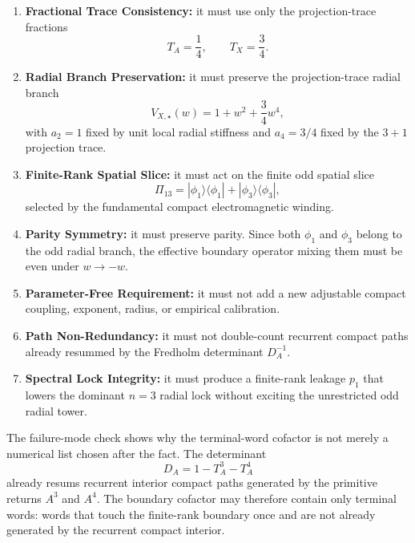 \documentclass[11pt]{article}
\begin{document}
\begin{tcolorbox}[colback=white, colframe=gray, colbacktitle=gray, title=\textbf{Compact closure requirements}]
\footnotesize
\begin{enumerate}
\item \textbf{Fractional Trace Consistency:} it must use only the projection-trace fractions
\begin{equation}
T_A=\frac14,
\qquad
T_X=\frac34.
\end{equation}

\item \textbf{Radial Branch Preservation:} it must preserve the projection-trace radial branch
\begin{equation}
V_{X,\star}(w)=1+w^2+\frac34w^4,
\end{equation}
with \(a_2=1\) fixed by unit local radial stiffness and \(a_4=3/4\) fixed by
the \(3+1\) projection trace.

\item \textbf{Finite-Rank Spatial Slice:} it must act on the finite odd spatial slice
\begin{equation}
\Pi_{13}
=
|\phi_1\rangle\langle\phi_1|
+
|\phi_3\rangle\langle\phi_3|,
\end{equation}
selected by the fundamental compact electromagnetic winding.

\item \textbf{Parity Symmetry:} it must preserve parity. Since both \(\phi_1\)
and \(\phi_3\) belong to the odd radial branch, the effective boundary operator
mixing them must be even under \(w\rightarrow-w\).

\item \textbf{Parameter-Free Requirement:} it must not add a new adjustable
compact coupling, exponent, radius, or empirical calibration.

\item \textbf{Path Non-Redundancy:} it must not double-count recurrent compact
paths already resummed by the Fredholm determinant \(D_A^{-1}\).

\item \textbf{Spectral Lock Integrity:} it must produce a finite-rank leakage
\(p_1\) that lowers the dominant \(n=3\) radial lock without exciting the
unrestricted odd radial tower.
\end{enumerate}
\end{tcolorbox}

The failure-mode check shows why the terminal-word cofactor is not merely a
numerical list chosen after the fact. The determinant
\begin{equation}
D_A=1-T_A^3-T_A^4
\end{equation}
already resums recurrent interior compact paths generated by the primitive
returns \(A^3\) and \(A^4\). The boundary cofactor may therefore contain only
terminal words: words that touch the finite-rank boundary once and are not
already generated by the recurrent compact interior.
\end{document}
